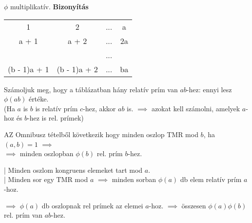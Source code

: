 \begin{frame}
  \begin{tcolorbox}[title={Tétel: $\phi$ multiplikativitása}]
  $\phi$ multiplikatív.
  \tcblower
    \textbf{Bizonyítás}
    \mmedskip

    \begin{tabular}{c c c c}
    1 & 2 & ... & a \\
    a + 1 & a + 2 & ... & 2a\\
     &  & ... &  \\
    (b - 1)a + 1 & (b - 1)a + 2 & ... & ba
    \end{tabular}
    \mmedskip

    Számoljuk meg, hogy a táblázatban hány relatív prím van $ab$-hez: ennyi lesz ${\phi}(ab)$ értéke.\\
    (Ha $a$ is $b$ is relatív prím $c$-hez, akkor $ab$ is. $\implies$ azokat kell számolni, amelyek $a$-hoz és $b$-hez is rel. prímek)\\
    \msmallskip

    AZ Omnibusz tételből következik hogy minden oszlop TMR mod $b$, ha $(a, b) = 1$ $\implies$\\
    $\implies$ minden oszlopban ${\phi}(b)$ rel. prím $b$-hez.\\
    \msmallskip

    | Minden oszlom kongruens elemeket tart mod $a$.\\
    | Minden sor egy TMR mod $a$ $\implies$ minden sorban ${\phi}(a)$ db elem relatív prím $a$-hoz.\\
    \msmallskip
    
    $\implies$ ${\phi}(a)$ db oszlopnak rel prímek az elemei $a$-hoz. $\implies$ összesen ${\phi}(a){\phi}(b)$ rel. prím van $ab$-hez.
  \end{tcolorbox}
\end{frame}

